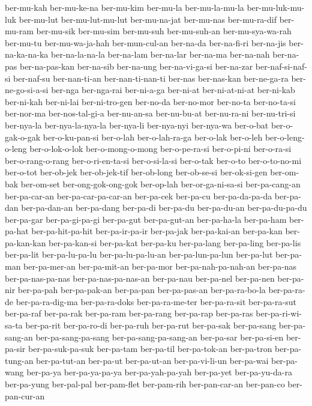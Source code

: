 {ber-mu-kah ber-mu-ke-na ber-mu-kim ber-mu-la ber-mu-la-mu-la
ber-mu-luk-mu-luk ber-mu-lut ber-mu-lut-mu-lut ber-mu-na-jat ber-mu-nas
ber-mu-ra-dif ber-mu-ram ber-mu-sik ber-mu-sim ber-mu-suh ber-mu-suh-an
ber-mu-sya-wa-rah ber-mu-tu ber-mu-wa-ja-hah ber-mun-cul-an ber-na-da
ber-na-fi-ri ber-na-jis ber-na-ka-na-ka ber-na-la-na-la ber-na-lam
ber-na-lar ber-na-ma ber-na-nah ber-na-pas ber-na-pas-kan ber-na-sib
ber-na-ung ber-na-vi-ga-si ber-na-zar ber-naf-si-naf-si ber-naf-su
ber-nan-ti-an ber-nan-ti-nan-ti ber-nas ber-nas-kan ber-ne-ga-ra
ber-ne-go-si-a-si ber-nga ber-nga-rai ber-ni-a-ga ber-ni-at
ber-ni-at-ni-at ber-ni-kab ber-ni-kah ber-ni-lai ber-ni-tro-gen ber-no-da
ber-no-mor ber-no-ta ber-no-ta-si ber-nor-ma ber-nos-tal-gi-a ber-nu-an-sa
ber-nu-bu-at ber-nu-ra-ni ber-nu-tri-si ber-nya-la ber-nya-la-nya-la
ber-nya-li ber-nya-nyi ber-nya-wa ber-o-bat ber-o-gak-o-gak
ber-o-ku-pan-si ber-o-lah ber-o-lah-ra-ga ber-o-lak ber-o-leh
ber-o-leng-o-leng ber-o-lok-o-lok ber-o-mong-o-mong ber-o-pe-ra-si
ber-o-pi-ni ber-o-ra-si ber-o-rang-o-rang ber-o-ri-en-ta-si ber-o-si-la-si
ber-o-tak ber-o-to ber-o-to-no-mi ber-o-tot ber-ob-jek ber-ob-jek-tif
ber-ob-long ber-ob-se-si ber-ok-si-gen ber-om-bak ber-om-set
ber-ong-gok-ong-gok ber-op-lah ber-or-ga-ni-sa-si ber-pa-cang-an
ber-pa-car-an ber-pa-car-pa-car-an ber-pa-cek ber-pa-cu ber-pa-da-pa-da
ber-pa-dan ber-pa-dan-an ber-pa-dang ber-pa-di ber-pa-du ber-pa-du-an
ber-pa-du-pa-du ber-pa-gar ber-pa-gi-pa-gi ber-pa-gut ber-pa-gut-an
ber-pa-ha-la ber-pa-ham ber-pa-hat ber-pa-hit-pa-hit ber-pa-ir-pa-ir
ber-pa-jak ber-pa-kai-an ber-pa-kan ber-pa-kan-kan ber-pa-kan-si
ber-pa-kat ber-pa-ku ber-pa-lang ber-pa-ling ber-pa-lis ber-pa-lit
ber-pa-lu-pa-lu ber-pa-lu-pa-lu-an ber-pa-lun-pa-lun ber-pa-lut ber-pa-man
ber-pa-mer-an ber-pa-mit-an ber-pa-mor ber-pa-nah-pa-nah-an ber-pa-nas
ber-pa-nas-pa-nas ber-pa-nas-pa-nas-an ber-pa-nau ber-pa-nel ber-pa-nen
ber-pa-nir ber-pa-pah ber-pa-pak-an ber-pa-pan ber-pa-pas-an
ber-pa-ra-bo-la ber-pa-ra-de ber-pa-ra-dig-ma ber-pa-ra-doks
ber-pa-ra-me-ter ber-pa-ra-sit ber-pa-ra-sut ber-pa-raf ber-pa-rak
ber-pa-ram ber-pa-rang ber-pa-rap ber-pa-ras ber-pa-ri-wi-sa-ta ber-pa-rit
ber-pa-ro-di ber-pa-ruh ber-pa-rut ber-pa-sak ber-pa-sang ber-pa-sang-an
ber-pa-sang-pa-sang ber-pa-sang-pa-sang-an ber-pa-sar ber-pa-si-en
ber-pa-sir ber-pa-suk-pa-suk ber-pa-tam ber-pa-til ber-pa-tok-an
ber-pa-tron ber-pa-tung-an ber-pa-tut-an ber-pa-ut ber-pa-ut-an
ber-pa-vi-li-un ber-pa-wai ber-pa-wang ber-pa-ya ber-pa-ya-pa-ya
ber-pa-yah-pa-yah ber-pa-yet ber-pa-yu-da-ra ber-pa-yung ber-pal-pal
ber-pam-flet ber-pam-rih ber-pan-car-an ber-pan-co ber-pan-cur-an
}

